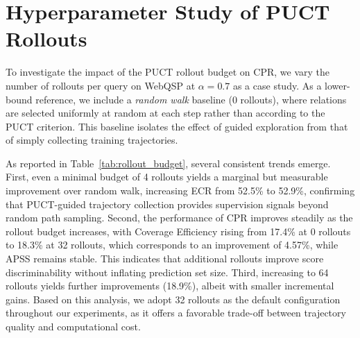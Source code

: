 \documentclass{article}
\theoremstyle{plain}
\theoremstyle{definition}
\theoremstyle{remark}
\begin{document}
\section{Hyperparameter Study of PUCT Rollouts}
\label{app:rollout}
To investigate the impact of the PUCT rollout budget on CPR, we vary the number of rollouts per query on WebQSP at $\alpha = 0.7$ as a case study. As a lower-bound reference, we include a \textit{random walk} baseline (0 rollouts), where relations are selected uniformly at random at each step rather than according to the PUCT criterion. This baseline isolates the effect of guided exploration from that of simply collecting training trajectories.

\begin{table}[h]
\centering
\caption{Hyperparameter study on the PUCT rollout budget on WebQSP at $\alpha = 0.7$. ``0 (Random Walk)'' denotes trajectory collection without PUCT guidance.}
\setlength{\tabcolsep}{1mm}
\label{tab:rollout_budget}
\end{table}


As reported in Table~\ref{tab:rollout_budget}, several consistent trends emerge. First, even a minimal budget of 4 rollouts yields a marginal but measurable improvement over random walk, increasing ECR from 52.5\% to 52.9\%, confirming that PUCT-guided trajectory collection provides supervision signals beyond random path sampling. Second, the performance of CPR improves steadily as the rollout budget increases, with Coverage Efficiency rising from 17.4\% at 0 rollouts to 18.3\% at 32 rollouts, which corresponds to an improvement of 4.57\%, while APSS remains stable. This indicates that additional rollouts improve score discriminability without inflating prediction set size. Third, increasing to 64 rollouts yields further improvements (18.9\%), albeit with smaller incremental gains. Based on this analysis, we adopt 32 rollouts as the default configuration throughout our experiments, as it offers a favorable trade-off between trajectory quality and computational cost.
\end{document}
